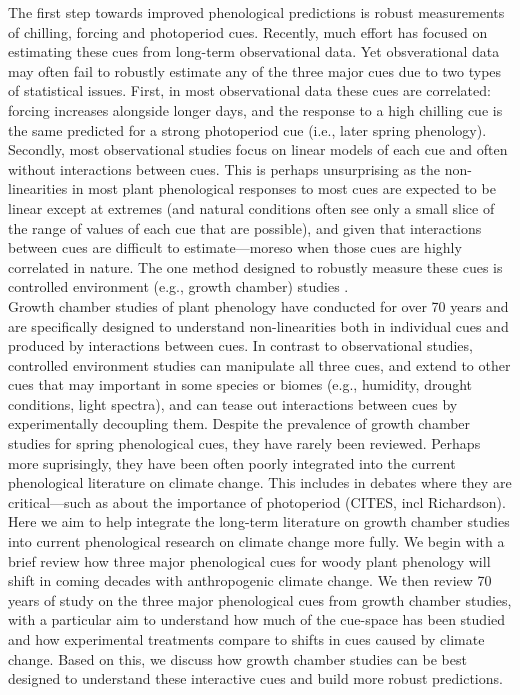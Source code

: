 \documentclass[11pt,letter]{article}
\begin{document}
The first step towards improved phenological predictions is robust measurements of chilling, forcing and photoperiod cues. Recently, much effort has focused on estimating these cues from long-term observational data. Yet obsverational data may often fail to robustly estimate any of the three major cues due to two types of statistical issues. First, in most observational data these cues are correlated: forcing increases alongside longer days, and the response to a high chilling cue is the same predicted for a strong photoperiod cue (i.e., later spring phenology). Secondly, most observational studies focus on linear models of each cue and often without interactions between cues. This is perhaps unsurprising as the non-linearities in most plant phenological responses to most cues are expected to be linear except at extremes (and natural conditions often see only a small slice of the range of values of each cue that are possible), and given that interactions between cues are difficult to estimate---moreso when those cues are highly correlated in nature. The one method designed to robustly measure these cues is controlled environment (e.g., growth chamber) studies \citep{nagano2012,satake2013}.\\

Growth chamber studies of plant phenology have conducted for over 70 years and are specifically designed to understand non-linearities both in individual cues and produced by interactions between cues. In contrast to observational studies, controlled environment studies can manipulate all three cues, and extend to other cues that may important in some species or biomes (e.g., humidity, drought conditions, light spectra), and can tease out interactions between cues by experimentally decoupling them. Despite the prevalence of growth chamber studies for spring phenological cues, they have rarely been reviewed. Perhaps more suprisingly, they have been often poorly integrated into the current phenological literature on climate change. This includes in debates where they are critical---such as about the importance of photoperiod (CITES, incl Richardson).\\

Here we aim to help integrate the long-term literature on growth chamber studies into current phenological research on climate change more fully. We begin with a brief review how three major phenological cues for woody plant phenology will shift in coming decades with anthropogenic climate change. We then review 70 years of study on the three major phenological cues from growth chamber studies, with a particular aim to understand how much of the cue-space has been studied and how experimental treatments compare to shifts in cues caused by climate change. Based on this, we discuss how growth chamber studies can be best designed to understand these interactive cues and build more robust predictions.\\
\end{document}
